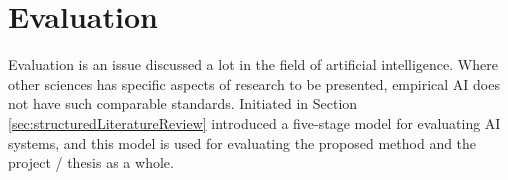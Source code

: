 \section{Evaluation}


Evaluation is an issue discussed a lot in the field of artificial intelligence. Where other sciences has specific aspects of research to be presented, empirical AI does not have such comparable standards. Initiated in Section \vref{sec:structuredLiteratureReview} introduced \citet{cohen88} a five-stage model for evaluating AI systems, and this model is used for evaluating the proposed method and the project / thesis as a whole. %

